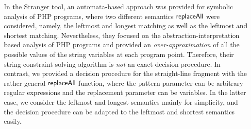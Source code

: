 

In the Stranger tool, %
an automata-based approach was provided for symbolic analysis of PHP programs, where two different semantics $\mathsf{replaceAll}$ were considered, namely, the leftmost and longest matching as well as the leftmost and shortest matching. Nevertheless, they focused on the abstraction-interpretation based analysis of PHP programs and provided an \emph{over-approximation} of all the possible values of the string variables at each program point. Therefore, their string constraint solving algorithm is \emph{not} an exact decision procedure. In contrast, we provided a decision procedure for the straight-line fragment with the rather general $\mathsf{replaceAll}$ function, where the pattern parameter can be arbitrary regular expressions and the replacement parameter can be variables. In the latter case,  we consider the leftmost and longest semantics mainly for simplicity, and the decision procedure can be adapted to the leftmost and shortest semantics easily.


